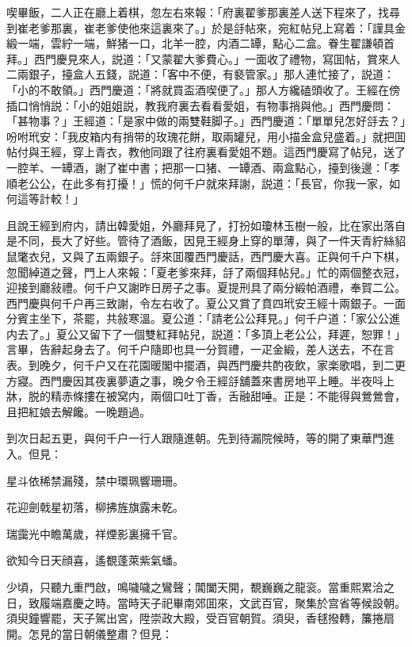 喫畢飯，二人正在廳上着棋，忽左右來報：「府裏翟爹那裏差人送下程來了，找尋到崔老爹那裏，崔老爹使他來這裏來了。」於是㧱帖來，宛紅帖兒上寫着：「謹具金緞一端，雲紵一端，鮮猪一口，北羊一腔，内酒二罈，點心二盒。眷生翟謙頓首拜。」西門慶見來人，説道：「又蒙翟大爹費心。」一面收了禮物，寫囬帖，賞來人二兩銀子，擡盒人五錢，説道：「客中不便，有褻管家。」那人連忙接了，説道：「小的不敢領。」西門慶道：「將就買盃酒喫便了。」那人方纔磕頭收了。王經在傍插口悄悄説：「小的姐姐説，教我府裏去看看愛姐，有物事捎與他。」西門慶問：「甚物事？」王經道：「是家中做的兩雙鞋脚子。」西門慶道：「單單兒怎好㧱去？」吩咐玳安：「我皮箱内有捎带的玫瑰花餅，取兩罐兒，用小描金盒兒盛着。」就把囬帖付與王經，穿上青衣，教他同跟了往府裏看愛姐不題。這西門慶寫了帖兒，送了一腔羊、一罈酒，謝了崔中書；把那一口猪、一罈酒、兩盒點心，擡到後邊：「孝順老公公，在此多有打擾！」慌的何千户就來拜謝，説道：「長官，你我一家，如何這等計較！」

且說王經到府内，請出韓愛姐，外廳拜見了，打扮如瓊林玉樹一般，比在家出落自是不同，長大了好些。管待了酒飯，因見王經身上穿的單薄，與了一件天青紵絲貂鼠氅衣兒，又與了五兩銀子。㧱來囬覆西門慶話，西門慶大喜。正與何千户下棋，忽聞綽道之聲，門上人來報：「夏老爹來拜，㧱了兩個拜帖兒。」忙的兩個整衣冠，迎接到廳敍禮。何千户又謝昨日房子之事。夏提刑具了兩分緞帕酒禮，奉賀二公。西門慶與何千户再三致謝，令左右收了。夏公又賞了賁四玳安王經十兩銀子。一面分賓主坐下，茶罷，共敍寒溫。夏公道：「請老公公拜見。」何千户道：「家公公進内去了。」夏公又留下了一個雙紅拜帖兒，説道：「多頂上老公公，拜遲，恕罪！」言畢，告辭起身去了。何千户隨即也具一分賀禮，一疋金緞，差人送去，不在言表。到晚夕，何千户又在花園暖閣中擺酒，與西門慶共酌夜飲，家楽歌唱，到二更方寢。西門慶因其夜裏夢遺之事，晚夕令王經㧱舖蓋來書房地平上睡。半夜呌上牀，脱的精赤條摟在被窝内，兩個口吐丁香，舌融甜唾。正是：不能得與鶯鶯會，且把紅娘去解饞。一晚題過。

到次日起五更，與何千户一行人跟隨進朝。先到待漏院候時，等的開了東華門進入。但見：

星斗依稀禁漏殘，禁中環珮響珊珊。

花迎劍戟星初落，柳拂旌旗露未乾。

瑞靄光中瞻萬歲，祥煙影裏擁千官。

欲知今日天顔喜，遙覩蓬萊紫氣蟠。

少頃，只聽九重門啟，鳴噦噦之鸞聲；閶闔天開，覩巍巍之龍衮。當重熙累洽之日，致履端嘉慶之時。當時天子祀畢南郊囬來，文武百官，聚集於宫省等候設朝。須臾鐘響罷，天子駕出宮，陞崇政大殿，受百官朝賀。須臾，香毬撥轉，簾捲扇開。怎見的當日朝儀整肅？但見：

